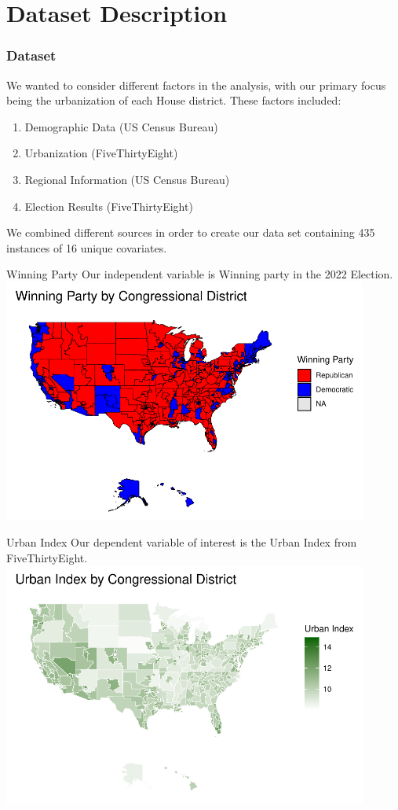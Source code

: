 \documentclass{beamer}
\begin{document}
\section{Dataset Description}
\begin{frame}
\frametitle{Dataset}
We wanted to consider different factors in the analysis, with our primary focus being the urbanization of each House district. These factors included: 
\begin{enumerate}
  \item Demographic Data (US Census Bureau)
  \item Urbanization (FiveThirtyEight)
  \item Regional Information (US Census Bureau)
  \item Election Results (FiveThirtyEight)
\end{enumerate}
We combined different sources in order to create our data set containing 435 instances of 16 unique covariates.
\end{frame}  


\begin{frame}{Winning Party}
Our independent variable is Winning party in the 2022 Election.
 \includegraphics[width=0.9\textwidth]{plots/party_map.pdf}
\end{frame} 


\begin{frame}{Urban Index}
Our dependent variable of interest is the Urban Index from FiveThirtyEight.
 \includegraphics[width=0.9\textwidth]{plots/urbanindexmap.pdf}
\end{frame} 
\end{document}
